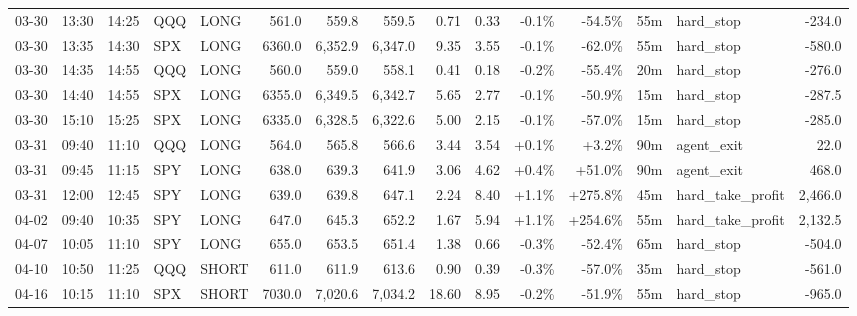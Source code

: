 \documentclass[11pt,a4paper,twoside]{article}
\begin{document}
\begin{landscape}
\begin{center}
\begin{longtable}{>{\color{txtmain}}l l l l l r r r r r r r r >{\color{txtmain}}l r}
03-30 & 13:30 & 14:25 & QQQ & LONG & 561.0 & 559.8 & 559.5 & 0.71 & 0.33 & \textcolor{lossred}{-0.1\%} & \textcolor{lossred}{-54.5\%} & 55m & hard\_stop & \textcolor{lossred}{-234.0} \\
03-30 & 13:35 & 14:30 & SPX & LONG & 6360.0 & 6,352.9 & 6,347.0 & 9.35 & 3.55 & \textcolor{lossred}{-0.1\%} & \textcolor{lossred}{-62.0\%} & 55m & hard\_stop & \textcolor{lossred}{-580.0} \\
03-30 & 14:35 & 14:55 & QQQ & LONG & 560.0 & 559.0 & 558.1 & 0.41 & 0.18 & \textcolor{lossred}{-0.2\%} & \textcolor{lossred}{-55.4\%} & 20m & hard\_stop & \textcolor{lossred}{-276.0} \\
03-30 & 14:40 & 14:55 & SPX & LONG & 6355.0 & 6,349.5 & 6,342.7 & 5.65 & 2.77 & \textcolor{lossred}{-0.1\%} & \textcolor{lossred}{-50.9\%} & 15m & hard\_stop & \textcolor{lossred}{-287.5} \\
03-30 & 15:10 & 15:25 & SPX & LONG & 6335.0 & 6,328.5 & 6,322.6 & 5.00 & 2.15 & \textcolor{lossred}{-0.1\%} & \textcolor{lossred}{-57.0\%} & 15m & hard\_stop & \textcolor{lossred}{-285.0} \\
03-31 & 09:40 & 11:10 & QQQ & LONG & 564.0 & 565.8 & 566.6 & 3.44 & 3.54 & \textcolor{wingreen}{+0.1\%} & \textcolor{wingreen}{+3.2\%} & 90m & agent\_exit & \textcolor{wingreen}{22.0} \\
03-31 & 09:45 & 11:15 & SPY & LONG & 638.0 & 639.3 & 641.9 & 3.06 & 4.62 & \textcolor{wingreen}{+0.4\%} & \textcolor{wingreen}{+51.0\%} & 90m & agent\_exit & \textcolor{wingreen}{468.0} \\
03-31 & 12:00 & 12:45 & SPY & LONG & 639.0 & 639.8 & 647.1 & 2.24 & 8.40 & \textcolor{wingreen}{+1.1\%} & \textcolor{wingreen}{+275.8\%} & 45m & hard\_take\_profit & \textcolor{wingreen}{2,466.0} \\
04-02 & 09:40 & 10:35 & SPY & LONG & 647.0 & 645.3 & 652.2 & 1.67 & 5.94 & \textcolor{wingreen}{+1.1\%} & \textcolor{wingreen}{+254.6\%} & 55m & hard\_take\_profit & \textcolor{wingreen}{2,132.5} \\
04-07 & 10:05 & 11:10 & SPY & LONG & 655.0 & 653.5 & 651.4 & 1.38 & 0.66 & \textcolor{lossred}{-0.3\%} & \textcolor{lossred}{-52.4\%} & 65m & hard\_stop & \textcolor{lossred}{-504.0} \\
04-10 & 10:50 & 11:25 & QQQ & SHORT & 611.0 & 611.9 & 613.6 & 0.90 & 0.39 & \textcolor{lossred}{-0.3\%} & \textcolor{lossred}{-57.0\%} & 35m & hard\_stop & \textcolor{lossred}{-561.0} \\
04-16 & 10:15 & 11:10 & SPX & SHORT & 7030.0 & 7,020.6 & 7,034.2 & 18.60 & 8.95 & \textcolor{lossred}{-0.2\%} & \textcolor{lossred}{-51.9\%} & 55m & hard\_stop & \textcolor{lossred}{-965.0} \\

\end{longtable}
\end{center}
\end{landscape}
\end{document}
